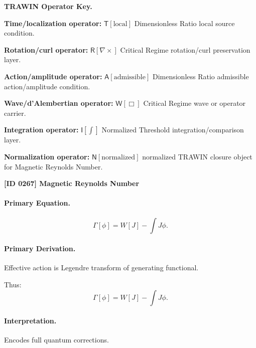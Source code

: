 \par\vspace{0.45\baselineskip}
\noindent\begin{minipage}[t]{\linewidth}
\begingroup
\small
\raggedright
\textbf{TRAWIN Operator Key.}\par
\noindent\textbf{Time/localization operator:} $\mathsf{T}\!\left[\mathrm{local}\right]$ Dimensionless Ratio local source condition.\par
\noindent\textbf{Rotation/curl operator:} $\mathsf{R}\!\left[\nabla\times\right]$ Critical Regime rotation/curl preservation layer.\par
\noindent\textbf{Action/amplitude operator:} $\mathsf{A}\!\left[\mathrm{admissible}\right]$ Dimensionless Ratio admissible action/amplitude condition.\par
\noindent\textbf{Wave/d'Alembertian operator:} $\mathsf{W}\!\left[\Box\right]$ Critical Regime wave or operator carrier.\par
\noindent\textbf{Integration operator:} $\mathsf{I}\!\left[\int\right]$ Normalized Threshold integration/comparison layer.\par
\noindent\textbf{Normalization operator:} $\mathsf{N}\!\left[\mathrm{normalized}\right]$ normalized TRAWIN closure object for Magnetic Reynolds Number.\par
\endgroup
\end{minipage}

\clearpage
\noindent\textbf{[ID 0267] Magnetic Reynolds Number}\par
\vspace{0.35em}
\paragraph{Primary Equation.}
\begin{equation}
\Gamma[\phi] = W[J] - \int J\phi.
\end{equation}

\paragraph{Primary Derivation.}
Effective action is Legendre transform of generating functional.

Thus:
\begin{equation}
\boxed{
\Gamma[\phi] = W[J] - \int J\phi.
}
\end{equation}

\paragraph{Interpretation.}
Encodes full quantum corrections.

